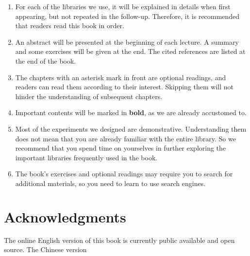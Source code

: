 \begin{enumerate}
	\item For each of the libraries we use, it will be explained in details when first appearing, but not repeated in the follow-up. Therefore, it is recommended that readers read this book in order.
	
	\item An abstract will be presented at the beginning of each lecture. A summary and some exercises will be given at the end. The cited references are listed at the end of the book.

	\item The chapters with an asterisk mark in front are optional readings, and readers can read them according to their interest. Skipping them will not hinder the understanding of subsequent chapters.
	
	\item Important contents will be marked in \textbf{bold}, as we are already accustomed to.

	\item Most of the experiments we designed are demonstrative. Understanding them does not mean that you are already familiar with the entire library. So we recommend that you spend time on yourselves in further exploring the important libraries frequently used in the book.

	\item The book's exercises and optional readings may require you to search for additional materials, so you need to learn to use search engines.
\end{enumerate}

\section{Acknowledgments}
The online English version of this book is currently public available and open source. The Chinese version

